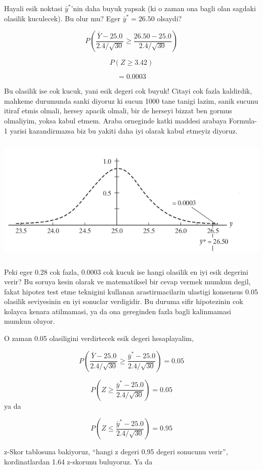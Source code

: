 \documentclass[12pt,fleqn]{article}\usepackage{../common}
\begin{document}
Hayali esik noktasi $\bar{y}^*$'nin daha buyuk yapsak (ki o zaman ona bagli
olan sagdaki olasilik kuculecek). Bu olur mu? Eger $\bar{y}^* = 26.50$
olsaydi? 

$$ P(\frac{\bar{Y} - 25.0}{2.4 / \sqrt{30}} \ge 
\frac{26.50 - 25.0}{2.4 / \sqrt{30}}) 
$$

$$ P(Z \ge 3.42) $$

$$ = 0.0003 $$

Bu olasilik ise cok kucuk, yani esik degeri cok buyuk! Citayi cok fazla
kaldirdik, mahkeme durumunda sanki diyoruz ki sucun 1000 tane tanigi lazim,
sanik sucunu itiraf etmis olmali, hersey apacik olmali, bir de herseyi
bizzat ben gormus olmaliyim, yoksa kabul etmem. Araba orneginde katki
maddesi arabaya Formula-1 yarisi kazandirmazsa biz bu yakiti daha iyi
olarak kabul etmeyiz diyoruz.

\includegraphics[height=6cm]{carhyp2.png}

Peki eger 0.28 cok fazla, 0.0003 cok kucuk ise hangi olasilik en iyi esik
degerini verir? Bu soruya kesin olarak ve matematiksel bir cevap vermek
mumkun degil, fakat hipotez test etme teknigini kullanan arastirmacilarin
ulastigi konsensus 0.05 olasilik seviyesinin en iyi sonuclar verdigidir. Bu
duruma sifir hipotezinin cok kolayca kenara atilmamasi, ya da ona
gereginden fazla bagli kalinmamasi mumkun oluyor.

O zaman 0.05 olasiligini verdirtecek esik degeri hesaplayalim,

$$ P(\frac{\bar{Y} - 25.0}{2.4 / \sqrt{30}} \ge 
\frac{\bar{y}^* - 25.0}{2.4 / \sqrt{30}}) = 0.05
$$

$$ P(Z \ge  \frac{\bar{y}^* - 25.0}{2.4 / \sqrt{30}}) = 0.05
$$
ya da

$$ P(Z \le  \frac{\bar{y}^* - 25.0}{2.4 / \sqrt{30}}) = 0.95 $$

z-Skor tablosuna bakiyoruz, ``hangi z degeri 0.95 degeri sonucunu verir'',
kordinatlardan 1.64 z-skorunu buluyoruz. Ya da
\end{document}
